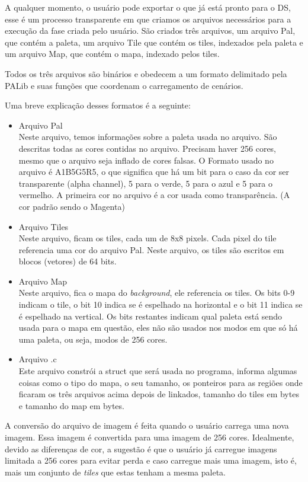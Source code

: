 \documentclass[brazil]{abnt}
\begin{document}
A qualquer momento, o usuário pode exportar o que já está pronto para o DS, esse é um processo transparente em que criamos os arquivos necessários para a execução da fase criada pelo usuário. São criados três arquivos, um arquivo Pal, que contém a paleta, um arquivo Tile que contém os tiles, indexados pela paleta e um arquivo Map, que contém o mapa, indexado pelos tiles.

Todos os três arquivos são binários e obedecem a um formato delimitado pela PALib e suas funções que coordenam o carregamento de cenários.

Uma breve explicação desses formatos é a seguinte:

\begin{itemize}
 \item Arquivo Pal\\
 Neste arquivo, temos informações sobre a paleta usada no arquivo. São descritas todas as cores contidas no arquivo. Precisam haver 256 cores, mesmo que o arquivo seja inflado de cores falsas. O Formato usado no arquivo é A1B5G5R5, o que significa que há um bit para o caso da cor ser transparente (alpha channel), 5 para o verde, 5 para o azul e 5 para o vermelho. A primeira cor no arquivo é a cor usada como transparência. (A cor padrão sendo o Magenta)\label{exp:A1B5G5R5}
 \item Arquivo Tiles\\
 Neste arquivo, ficam os tiles, cada um de 8x8 pixels. Cada pixel do tile referencia uma cor do arquivo Pal. Neste arquivo, os tiles são escritos em blocos (vetores) de 64 bits. 
 \item Arquivo Map\\
 Neste arquivo, fica o mapa do \textit{background}, ele referencia os tiles. Os bits 0-9 indicam o tile, o bit 10 indica se é espelhado na horizontal e o bit 11 indica se é espelhado na vertical. Os bits restantes indicam qual paleta está sendo usada para o mapa em questão, eles não são usados nos modos em que só há uma paleta, ou seja, modos de 256 cores.
 \item Arquivo .c\\
 Este arquivo constrói a struct que será usada no programa, informa algumas coisas como o tipo do mapa, o seu tamanho, os ponteiros para as regiões onde ficaram os três arquivos acima depois de linkados, tamanho do tiles em bytes e tamanho do map em bytes. 
\end{itemize}

A conversão do arquivo de imagem é feita quando o usuário carrega uma nova imagem. Essa imagem é convertida para uma imagem de 256 cores. Idealmente, devido as diferenças de cor, a sugestão é que o usuário já carregue imagens limitada a 256 cores para evitar perda e caso carregue mais uma imagem, isto é, mais um conjunto de \textit{tiles} que estas tenham a mesma paleta.
\end{document}
